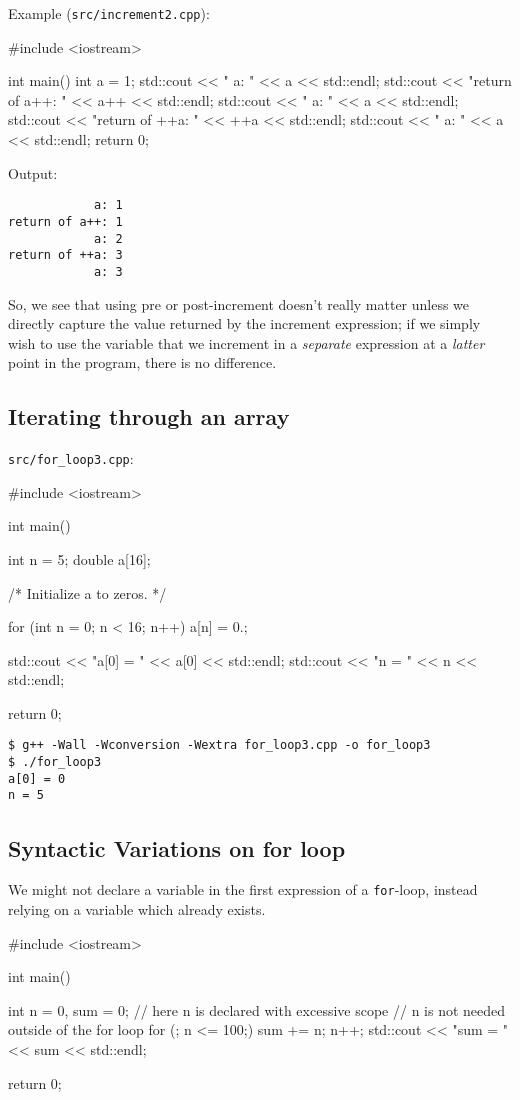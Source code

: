 \documentclass[12pt,letterpaper,twoside]{article}
\begin{document}
Example (\texttt{src/increment2.cpp}):

\begin{cpp}
#include <iostream>

int main() {
  int a = 1;
  std::cout << "            a: " << a   << std::endl;
  std::cout << "return of a++: " << a++ << std::endl;
  std::cout << "            a: " << a   << std::endl;
  std::cout << "return of ++a: " << ++a << std::endl;
  std::cout << "            a: " << a   << std::endl;
  return 0;
}
\end{cpp}

Output:

\begin{verbatim}
            a: 1
return of a++: 1
            a: 2
return of ++a: 3
            a: 3
\end{verbatim}

So, we see that using pre or post-increment doesn't really matter
unless we directly capture the value returned by the increment
expression; if we simply wish to use the variable that we increment in
a \emph{separate} expression at a \emph{latter} point in the program,
there is no difference.

\subsection{Iterating through an array}
\texttt{src/for\_loop3.cpp}:

\begin{cpp}
#include <iostream>

int main() {
  int n = 5;
  double a[16];

  /* Initialize a to zeros. */

  for (int n = 0; n < 16; n++) {
    a[n] = 0.;
  }

  std::cout << "a[0] = " << a[0] << std::endl;
  std::cout << "n = " << n << std::endl;

  return 0;
}
\end{cpp}

\begin{verbatim}
$ g++ -Wall -Wconversion -Wextra for_loop3.cpp -o for_loop3
$ ./for_loop3
a[0] = 0
n = 5
\end{verbatim}

\subsection{Syntactic Variations on for loop}
We might not declare a variable in the first expression of a
\texttt{for}-loop, instead relying on a variable which already exists.
\begin{cpp}
#include <iostream>

int main() {
  int n = 0, sum = 0;
  // here n is declared with excessive scope
  // n is not needed outside of the for loop
  for (; n <= 100;) {
    sum += n;
    n++;
  }
  std::cout << "sum = " << sum << std::endl;

  return 0;
}
\end{cpp}
\end{document}
